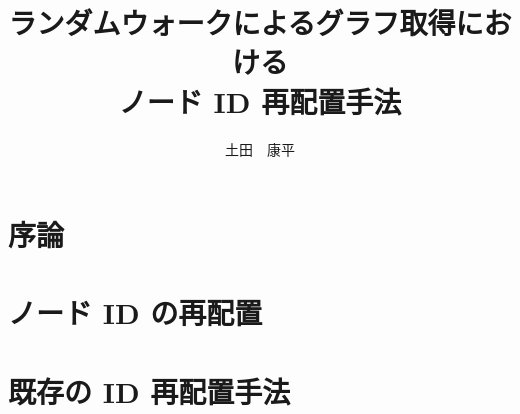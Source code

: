 \documentclass[12pt]{b-thesis}
\begin{document}
\title{ランダムウォークによるグラフ取得における\\ノード ID 再配置手法}
\titleinenglish{}
\subteacher{}
\courseinenglish{}
\author{土田　康平}
\maketitle

\courseinenglish{}
\authorinenglish{}
\titleinenglish{}



\makejabstract

\clearpage


\setcounter{page}{1}

\tableofcontents
\thispagestyle{plain}

\listoffigures
\listoftables

\clearpage


\pagestyle{headings}
\setcounter{page}{1}

\clearpage

\chapter{序論}
\label{chap:introduction}


\chapter{ノード ID の再配置}
\label{chap:existing_technology}


\chapter{既存の ID 再配置手法}
\label{chap:related_research}


\end{document}
